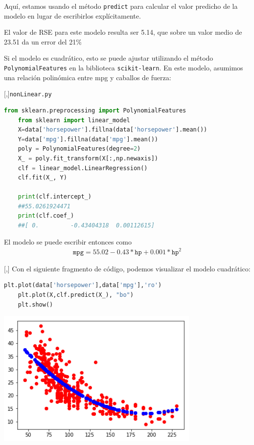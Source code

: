 Aquí, estamos usando el método \texttt{predict} para calcular el valor predicho de la
modelo en lugar de escribirlos explícitamente.

El valor de RSE para este modelo resulta ser 5.14, que sobre un valor medio de 23.51 da un error del 21\%



Si el modelo es cuadrático, esto se puede ajustar utilizando el método \texttt{PolynomialFeatures} en la biblioteca \texttt{scikit-learn}. En este modelo, asumimos una relación polinómica entre mpg
y caballos de fuerza:

[,]{\texttt{nonLinear.py}}
\begin{lstlisting}[language=Python]
	from sklearn.preprocessing import PolynomialFeatures
	from sklearn import linear_model
	X=data['horsepower'].fillna(data['horsepower'].mean())
	Y=data['mpg'].fillna(data['mpg'].mean())
	poly = PolynomialFeatures(degree=2)
	X_ = poly.fit_transform(X[:,np.newaxis])
	clf = linear_model.LinearRegression()
	clf.fit(X_, Y)
	
	print(clf.intercept_)
	##55.0261924471
	print(clf.coef_)
	##[ 0.         -0.43404318  0.00112615]
\end{lstlisting}


El modelo se puede escribir entonces como
\begin{align}
	\texttt{mpg}  = 55.02 -0.43*\texttt{hp}+0.001*\texttt{hp}^{2}
\end{align}

[,]{}
Con el siguiente fragmento de código, podemos visualizar el modelo cuadrático:
\begin{lstlisting}[language=Python]
	plt.plot(data['horsepower'],data['mpg'],'ro')
	plt.plot(X,clf.predict(X_), "bo")
	plt.show()
\end{lstlisting}


\begin{center}
	\includegraphics[width=10cm,keepaspectratio=true]{./images/hpNLR.png}
\end{center}


